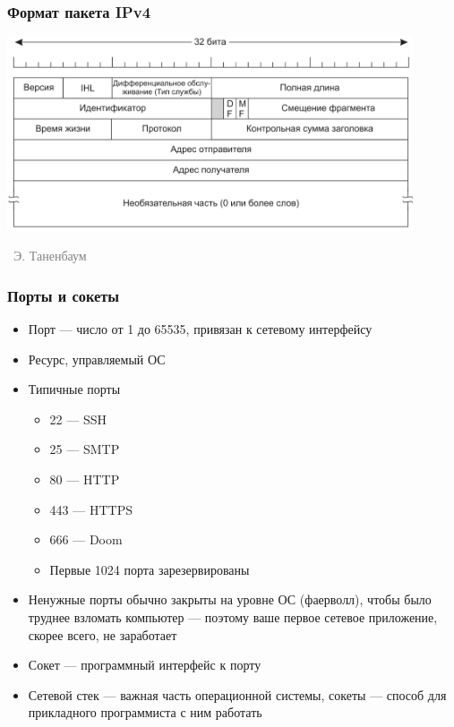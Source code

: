 \documentclass[xetex,mathserif,serif]{beamer}
\newcommand{\attribution}[1] {
\vspace{-5mm}\begin{flushright}\begin{scriptsize}\textcolor{gray}{\textcopyright\, #1}\end{scriptsize}\end{flushright}
}
\begin{document}
    \begin{frame}
        \frametitle{Формат пакета IPv4}
        \begin{center}
            \includegraphics[width=0.9\textwidth]{ipv4.png}
            \attribution{Э. Таненбаум}
        \end{center}
    \end{frame}

    \begin{frame}
        \frametitle{Порты и сокеты}
        \begin{itemize}
            \item Порт --- число от 1 до 65535, привязан к сетевому интерфейсу
            \item Ресурс, управляемый ОС
            \item Типичные порты
            \begin{itemize}
                \item 22 --- SSH
                \item 25 --- SMTP
                \item 80 --- HTTP
                \item 443 --- HTTPS
                \item 666 --- Doom
                \item Первые 1024 порта зарезервированы
            \end{itemize}
            \item Ненужные порты обычно закрыты на уровне ОС (фаерволл), чтобы было труднее взломать компьютер --- поэтому ваше первое сетевое приложение, скорее всего, не заработает
            \item Сокет --- программный интерфейс к порту
            \item Сетевой стек --- важная часть операционной системы, сокеты --- способ для прикладного программиста с ним работать
        \end{itemize}
    \end{frame}
\end{document}
